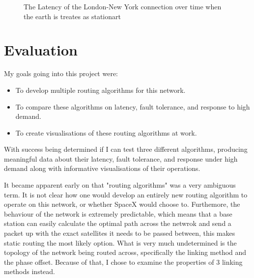 \documentclass[12pt]{article}
\begin{document}
\begin{figure}
\label{fig:Latency London To New York (Not Accounting for Rotation of Earth)}
\caption{The Latency of the London-New York connection over time when the earth is treates as stationart}
\end{figure}

\section{Evaluation}

My goals going into this project were:

\begin{itemize}
\item To develop multiple routing algorithms for this network.
\item To compare these algorithms on latency, fault tolerance, and response to high demand.
\item To create visualisations of these routing algorithms at work.
\end{itemize}

With success being determined if I can test three different algorithms, producing meaningful data about their latency, fault tolerance, and response under high demand along with informative visualisations of their operations. 

It became apparent early on that "routing algorithms" was a very ambiguous term. It is not clear how one would develop an entirely new routing algorithm to operate on this network, or whether SpaceX would choose to. Furthemore, the behaviour of the network is extremely predictable, which means that a base station can easily calculate the optimal path across the netwrok and send a packet up with the exact satellites it needs to be passed between, this makes static routing the most likely option. What is very much undetermined is the topology of the network being routed across, specifically the linking method and the phase offset. Because of that, I chose to examine the properties of 3 linking methods instead.
\end{document}

